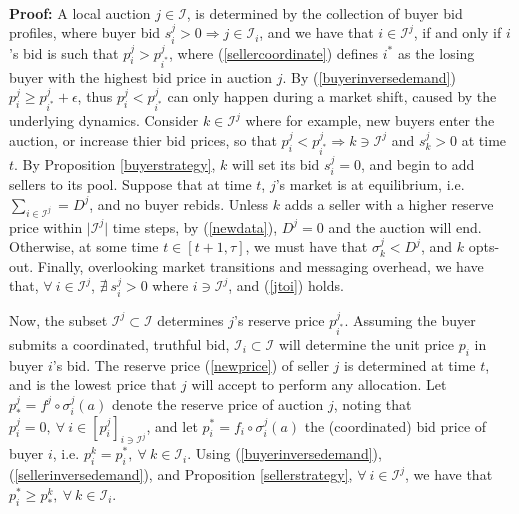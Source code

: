 \documentclass[12pt]{article}
\theoremstyle{definition}
\newcommand{\mcI}{\mathcal{I}}
\newcommand{\g}{\sigma}
\begin{document}
\begin{multicols}{2}
{\begin{equation}
\end{equation}
}\\
\textbf{Proof:}
A local auction $j\in\mcI$, is determined by the collection of buyer bid
profiles, where buyer bid $s_i^j > 0 \Rightarrow j\in\mcI_i$, and we have that $i\in\mcI^j$,
if and only if $i$'s bid is such that $p_i^j > p_{i^*}^j$, where
(\ref{sellercoordinate}) defines $i^*$ as the losing buyer with the highest bid
price in auction $j$. By (\ref{buyerinversedemand}) $p_i^j \ge
p_{i^*}^j+\epsilon$, thus $p_i^j < p_{i^*}^j$ can only happen during a market
shift, caused by the underlying dynamics.
Consider $k\in\mcI^j$ where for example, new buyers enter the auction, or increase
thier bid prices, so that $p_i^j < p_{i^*}^j\Rightarrow k\ni\mcI^j$ and
$s_k^j>0$ at time $t$. 
By Proposition \ref{buyerstrategy}, $k$ will set its bid $s_i^j=0$, and begin to add sellers to its pool.
Suppose that at time $t$, $j$'s market is at equilibrium, i.e. $\sum_{i\in\mcI^j} = D^j$, and
no buyer rebids. Unless $k$ adds a seller with a higher reserve
price within $\vert\mcI^j\vert$ time steps, by (\ref{newdata}), $D^j=0$ and the
auction will end. Otherwise, at some time $t\in[t+1,\tau]$, we must have that $\g_k^j <
D^j$, and $k$ opts-out. Finally, overlooking market transitions and messaging
overhead, we have that,
$\forall \ i\in\mcI^j$, $\nexists \ s_i^j > 0$ where $i \ni \mcI^j$, and (\ref{jtoi})
holds.
\iffalse
Furthermore, we note that $\lambda \subset \mcI$ is a complete and disjoint set
of bid vectors with respect to auction $j$. That is, $\forall \ i \in \mcI^j,
s_i^k > 0 \in \lambda$ if and only if $s_i^k>0 \in\mcI$, and so $s_i \in \lambda
\equiv s_i \in \mcI$. (NEED TO ADD TO LEMMA AND PROVE?)
\fi

Now, the subset $\mcI^j \subset \mcI$
determines $j$'s reserve price $p_{i^*}^j$. Assuming the buyer submits a
coordinated, truthful bid, $\mcI_i\subset \mcI$ 
will determine the unit price $p_{i}$ in buyer $i$'s bid.
The reserve price (\ref{newprice}) of seller $j$ is determined at time $t$, and is
the lowest price that $j$ will accept to perform any allocation.
Let $p_*^j = f^j \circ \g_i^j(a) $ denote the reserve
price of auction $j$, noting that $p_i^j=0, \ \forall \ i \in
[p_i^j]_{i\ni\mcI^j}$, and let $p_i^*= f_i \circ \g_i^j(a)$ the (coordinated) bid price of buyer $i$, i.e. $p_i^k = p_i^*,
\ \forall \ k \in\mcI_i$. 
Using (\ref{buyerinversedemand}), (\ref{sellerinversedemand}), and Proposition
\ref{sellerstrategy}, $\forall \ i \in \mcI^j$, we have that $p_i^* \ge p_*^k,
\ \forall \ k \in\mcI_i$.


\end{multicols}
\end{document}
